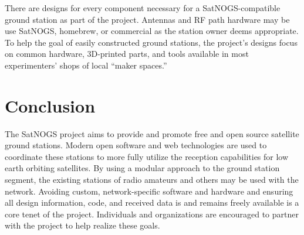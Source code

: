 \documentclass[conference,letterpaper,12pt]{IEEEtran}
\begin{document}
There are designs for every component necessary for a SatNOGS-compatible ground station as part of the project.
Antennas and RF path hardware may be use SatNOGS, homebrew, or commercial as the station owner deems appropriate.
To help the goal of easily constructed ground stations, the project's designs focus on common hardware, 3D-printed parts, and tools available in most experimenters' shops of local ``maker spaces.''


\section{Conclusion}
The SatNOGS project aims to provide and promote free and open source satellite ground stations.
Modern open software and web technologies are used to coordinate these stations to more fully utilize the reception capabilities for low earth orbiting satellites.
By using a modular approach to the ground station segment, the existing stations of radio amateurs and others may be used with the network.
Avoiding custom, network-specific software and hardware and ensuring all design information, code, and received data is and remains freely available is a core tenet of the project.
Individuals and organizations are encouraged to partner with the project to help realize these goals.


\end{document}

